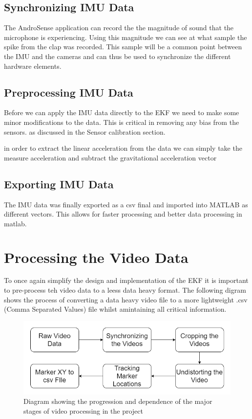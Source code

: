 \subsection{Synchronizing IMU Data}
The AndroSense application can record the the magnitude of sound that the microphone is experiencing. Using this magnitude we can see at what sample the spike from the clap was recorded. This sample will be a common point between the IMU and the cameras and can thus be used to synchronize the different hardware elements.

\subsection{Preprocessing IMU Data}
Before we can apply the IMU data directly to the EKF we need to make some minor modifications to the data. This is critical in removing any bias from the sensors. as discussed in the Sensor calibration section.

in order to extract the linear acceleration from the data we can simply take the measure acceleration and subtract the gravitational acceleration vector

\subsection{Exporting IMU Data}
The IMU data was finally exported as a csv final and imported into MATLAB as different vectors. This allows for faster processing and better data processing in matlab.





\section{Processing the Video Data}
To once again simplify the design and implementation of the EKF it is important to pre-process teh video data to a leess data heavy format. The following digram shows the process of converting a data heavy video file to a more lightweight .csv (Comma Separated Values) file whilst amintaining all critical information.

\begin{figure}[!ht]
  \includegraphics[width=\linewidth]{figures/videoProcess.png}
  \caption{Diagram showing the progression and dependence of the major stages of video processing in the project}
  \label{fig:videoProcess}
\end{figure}


